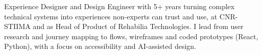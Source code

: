 {Experience Designer and Design Engineer with 5+ years turning complex technical systems into experiences non-experts can trust and use, at CNR-STIIMA and as Head of Product of Rehabilia Technologies. I lead from user research and journey mapping to flows, wireframes and coded prototypes (React, Python), with a focus on accessibility and AI-assisted design.}
